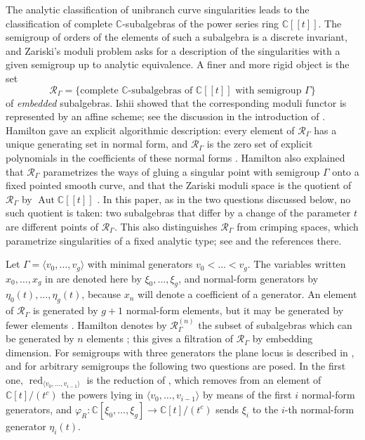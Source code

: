 \documentclass{amsart}
\theoremstyle{definition}
\theoremstyle{remark}
\numberwithin{equation}{section}
\newcommand{\CC}{\mathbb{C}}
\newcommand{\Rs}{\mathcal{R}_\Gamma}
\newcommand{\Rd}[1]{\mathcal{R}^{(#1)}_\Gamma}
\newcommand{\ps}{[\![t]\!]}
\DeclareMathOperator{\red}{red}
\DeclareMathOperator{\Aut}{Aut}
\begin{document}
The analytic classification of unibranch curve singularities leads to the classification of complete $\CC$-subalgebras of the power series ring $\CC\ps$. The semigroup of orders of the elements of such a subalgebra is a discrete invariant, and Zariski's moduli problem \cite{Zar86} asks for a description of the singularities with a given semigroup up to analytic equivalence. A finer and more rigid object is the set
\[
\Rs=\{\text{complete $\CC$-subalgebras of $\CC\ps$ with semigroup $\Gamma$}\}
\]
of \emph{embedded} subalgebras. Ishii \cite{Ish80} showed that the corresponding moduli functor is represented by an affine scheme; see the discussion in the introduction of \cite{Ham20}. Hamilton \cite{Ham20} gave an explicit algorithmic description: every element of $\Rs$ has a unique generating set in normal form, and $\Rs$ is the zero set of explicit polynomials in the coefficients of these normal forms \cite[Theorem~2.22]{Ham20}. Hamilton also explained that $\Rs$ parametrizes the ways of gluing a singular point with semigroup $\Gamma$ onto a fixed pointed smooth curve, and that the Zariski moduli space is the quotient of $\Rs$ by $\Aut\CC\ps$ \cite[Sections~1 and~4.3]{Ham20}. In this paper, as in the two questions discussed below, no such quotient is taken: two subalgebras that differ by a change of the parameter $t$ are different points of $\Rs$. This also distinguishes $\Rs$ from crimping spaces, which parametrize singularities of a fixed analytic type; see \cite[Section~1.6]{Bat24} and the references there.

Let $\Gamma=\langle v_0,\dots,v_g\rangle$ with minimal generators $v_0<\dots<v_g$. The variables written $x_0,\dots,x_g$ in \cite{Ham20} are denoted here by $\xi_0,\dots,\xi_g$, and normal-form generators by $\eta_0(t),\dots,\eta_g(t)$, because $x_n$ will denote a coefficient of a generator. An element of $\Rs$ is generated by $g+1$ normal-form elements, but it may be generated by fewer elements \cite[Remark~2.5]{Ham20}. Hamilton denotes by $\Rd{n}$ the subset of subalgebras which can be generated by $n$ elements \cite[Definition~4.4]{Ham20}; this gives a filtration of $\Rs$ by embedding dimension. For semigroups with three generators the plane locus is described in \cite[Section~4.2]{Ham20}, and for arbitrary semigroups the following two questions are posed. In the first one, $\red_{\langle v_0,\dots,v_{i-1}\rangle}$ is the reduction of \cite[Algorithm~2.15]{Ham20}, which removes from an element of $\CC[t]/(t^c)$ the powers lying in $\langle v_0,\dots,v_{i-1}\rangle$ by means of the first $i$ normal-form generators, and $\varphi_R\colon\CC[\xi_0,\dots,\xi_g]\to\CC[t]/(t^c)$ sends $\xi_i$ to the $i$-th normal-form generator $\eta_i(t)$.
\end{document}

